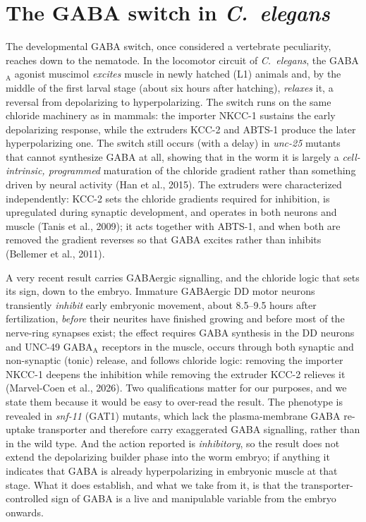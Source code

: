 \documentclass[11pt,a4paper]{article}
\begin{document}
\section{The GABA switch in \emph{C.~elegans}}\label{app:worm}
The developmental GABA switch, once considered a vertebrate peculiarity, reaches down to the nematode. In the locomotor circuit of \emph{C.~elegans}, the GABA$_{\mathrm{A}}$ agonist muscimol \emph{excites} muscle in newly hatched (L1) animals and, by the middle of the first larval stage (about six hours after hatching), \emph{relaxes} it, a reversal from depolarizing to hyperpolarizing. The switch runs on the same chloride machinery as in mammals: the importer NKCC-1 sustains the early depolarizing response, while the extruders KCC-2 and ABTS-1 produce the later hyperpolarizing one. The switch still occurs (with a delay) in \emph{unc-25} mutants that cannot synthesize GABA at all, showing that in the worm it is largely a \emph{cell-intrinsic, programmed} maturation of the chloride gradient rather than something driven by neural activity (Han et al., 2015). The extruders were characterized independently: KCC-2 sets the chloride gradients required for inhibition, is upregulated during synaptic development, and operates in both neurons and muscle (Tanis et al., 2009); it acts together with ABTS-1, and when both are removed the gradient reverses so that GABA excites rather than inhibits (Bellemer et al., 2011).

A very recent result carries GABAergic signalling, and the chloride logic that sets its sign, down to the embryo. Immature GABAergic DD motor neurons transiently \emph{inhibit} early embryonic movement, about 8.5--9.5 hours after fertilization, \emph{before} their neurites have finished growing and before most of the nerve-ring synapses exist; the effect requires GABA synthesis in the DD neurons and UNC-49 GABA$_{\mathrm{A}}$ receptors in the muscle, occurs through both synaptic and non-synaptic (tonic) release, and follows chloride logic: removing the importer NKCC-1 deepens the inhibition while removing the extruder KCC-2 relieves it (Marvel-Coen et al., 2026). Two qualifications matter for our purposes, and we state them because it would be easy to over-read the result. The phenotype is revealed in \emph{snf-11} (GAT1) mutants, which lack the plasma-membrane GABA re-uptake transporter and therefore carry exaggerated GABA signalling, rather than in the wild type. And the action reported is \emph{inhibitory}, so the result does not extend the depolarizing builder phase into the worm embryo; if anything it indicates that GABA is already hyperpolarizing in embryonic muscle at that stage. What it does establish, and what we take from it, is that the transporter-controlled sign of GABA is a live and manipulable variable from the embryo onwards.
\end{document}
